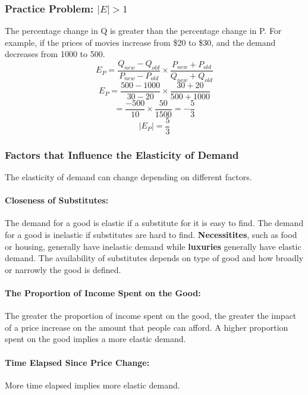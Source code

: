 \documentclass[letterpaper, 12pt]{article}
\begin{document}
\subsubsection{Practice Problem: \(|E| > 1 \)}
The percentage change in Q is greater than the percentage change in P.
For example, if the prices of movies increase from \$20 to \$30, and the demand
decreases from 1000 to 500.
\[ E_{P} = \frac{Q_{new}-Q_{old}}{P_{new}-P_{old}}\times
       \frac{P_{new}+P_{old}}{Q_{new}+Q_{old}} \]
\[ E_{P} = \frac{500-1000}{30-20}\times\frac{30+20}{500+1000} \]
\[ = \frac{-500}{10}\times\frac{50}{1500} = -\frac{5}{3} \]
\[ |E_{P}| = \frac{5}{3} \]

\subsubsection{Factors that Influence the Elasticity of Demand}
The elasticity of demand can change depending on different factors.

\paragraph{Closeness of Substitutes:} The demand for a good is elastic if a
substitute for it is easy to find. The demand for a good is inelastic if
substitutes are hard to find. \textbf{Necessitites}, such as food or housing,
generally have inelastic demand while \textbf{luxuries} generally have elastic
demand. The availability of substitutes depends on type of good and how
broadly or narrowly the good is defined.

\paragraph{The Proportion of Income Spent on the Good:}
The greater the proportion of income spent on the good, the greater the impact
of a price increase on the amount that people can afford. A higher proportion
spent on the good implies a more elastic demand.

\paragraph{Time Elapsed Since Price Change:}
More time elapsed implies more elastic demand.
\end{document}
